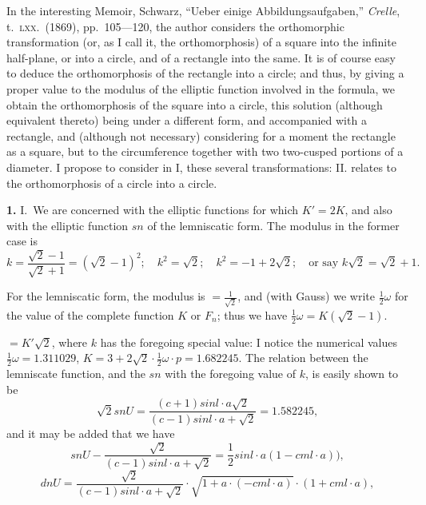 \documentclass[11pt,a4paper]{book}
\begin{document}
\newpage
{}

In the interesting Memoir, Schwarz, ``Ueber einige Abbildungsaufgaben,'' \textit{Crelle}, t.\ \textsc{lxx}.\ (1869), pp.\ 105---120, the author considers the orthomorphic transformation (or, as I call it, the orthomorphosis) of a square into the infinite half-plane, or into a circle, and of a rectangle into the same. It is of course easy to deduce the orthomorphosis of the rectangle into a circle; and thus, by giving a proper value to the modulus of the elliptic function involved in the formula, we obtain the orthomorphosis of the square into a circle, this solution (although equivalent thereto) being under a different form, and accompanied with a rectangle, and (although not necessary) considering for a moment the rectangle as a square, but to the circumference together with two two-cusped portions of a diameter. I propose to consider in I, these several transformations: II. relates to the orthomorphosis of a circle into a circle.

\textbf{1.} I.\ We are concerned with the elliptic functions for which $K' = 2K$, and also with the elliptic function $sn$ of the lemniscatic form. The modulus in the former case is
\[
k = \frac{\sqrt{2} - 1}{\sqrt{2} + 1} = (\sqrt{2} - 1)^2; \quad k^2 = \sqrt{2}; \quad k^2 = -1 + 2\sqrt{2}; \quad \text{or say } k\sqrt{2} = \sqrt{2} + 1.
\]

For the lemniscatic form, the modulus is $= \frac{1}{\sqrt{2}}$, and (with Gauss) we write $\frac{1}{2}\omega$ for the value of the complete function $K$ or $F_n$; thus we have $\frac{1}{2}\omega = K(\sqrt{2} - 1)$.

$= K' \sqrt{2}$, where $k$ has the foregoing special value: I notice the numerical values $\frac{1}{2}\omega = 1.311029$, $K = 3 + 2\sqrt{2} \cdot \frac{1}{2}\omega \cdot p = 1.682245$. The relation between the lemniscate function, and the $sn$ with the foregoing value of $k$, is easily shown to be
\[
\sqrt{2} sn U = \frac{(c + 1) sin l \cdot a \sqrt{2}}{(c - 1) sin l \cdot a + \sqrt{2}} = 1.582245,
\]
and it may be added that we have
\[
sn U - \frac{\sqrt{2}}{(c - 1) sin l \cdot a + \sqrt{2}} = \frac{1}{2} sin l \cdot a (1 - cml \cdot a)),
\]
\[
dn U = \frac{\sqrt{2}}{(c - 1) sin l \cdot a + \sqrt{2}} \cdot \sqrt{1 + a \cdot (- cml \cdot a)} \cdot (1 + cml \cdot a),
\]
\end{document}
